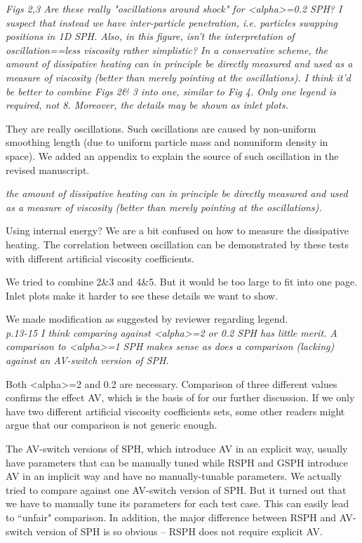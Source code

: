 \documentclass[10pt,a4paper]{article}
\begin{document}
\textit{Figs 2,3 Are these really "oscillations around shock" for <alpha>=0.2 SPH? I suspect that instead we have inter-particle penetration, i.e.
particles swapping positions in 1D SPH. Also, in this figure, isn't the interpretation of oscillation==less viscosity rather simplistic? In a conservative scheme, the amount of dissipative heating can in principle be directly measured and used as a measure of viscosity (better than merely pointing at the oscillations).
I think it'd be better to combine Figs 2\& 3 into one, similar to Fig 4. Only one legend is required, not 8. Moreover, the details may be shown as inlet plots.}

They are really oscillations. Such oscillations are caused by non-uniform smoothing length (due to uniform particle mass and nonuniform density in space). We added an appendix to explain the source of such oscillation in the revised manuscript.

\textit{the amount of dissipative heating can in principle be directly measured and used as a measure of viscosity (better than merely pointing at the oscillations).}  

Using internal energy? We are a bit confused on how to measure the dissipative heating. The correlation between oscillation can be demonstrated by these tests with different artificial viscosity coefficients.

We tried to combine 2\&3 and 4\&5. But it would be too large to fit into one page. Inlet plots make it harder to see these details we want to show.

We made modification as suggested by reviewer regarding legend.
\\[3pt]

\textit{p.13-15 I think comparing against <alpha>=2 or 0.2 SPH has little merit.
A comparison to <alpha>=1 SPH makes sense as does a comparison (lacking)
against an AV-switch version of SPH.}

Both <alpha>=2 and 0.2 are necessary. Comparison of three different values confirms the effect AV, which is the basis of for our further discussion. If we only have two different artificial viscosity coefficients sets, some other readers might argue that our comparison is not generic enough.

The AV-switch versions of SPH, which introduce AV in an explicit way, usually have parameters that can be manually tuned while RSPH and GSPH introduce AV in an implicit way and have no manually-tunable parameters. 
We actually tried to compare against one AV-switch version of SPH. But it turned out that we have to manually tune its parameters for each test case. This can easily lead to ``unfair" comparison. In addition, the major difference between RSPH and AV-switch version of SPH is so obvious -- RSPH does not require explicit AV.
\\[3pt]
\end{document}
